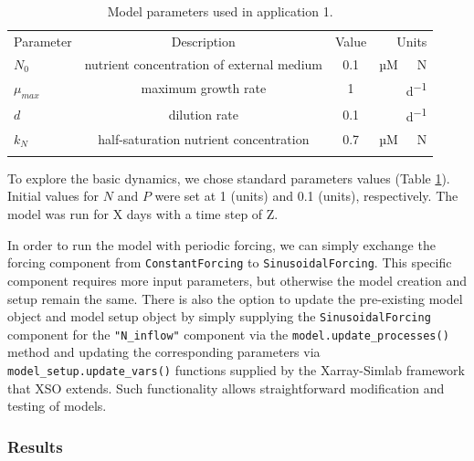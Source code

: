 \documentclass[journal abbreviation, manuscript]{copernicus}
\begin{document}
%
\begin{table}[t]
\caption{Model parameters used in application 1.}
\begin{tabular}{l c c r}
\tophline
Parameter & Description & Value & Units \\
\middlehline

$N_0$ & nutrient concentration of external medium & 0.1 & \unit{µM \ N} \\
$\mu_{max}$ & maximum growth rate & 1 & \unit{d^{-1}} \\
$d$ & dilution rate & 0.1 & \unit{d^{-1}}\\
$k_N$ & half-saturation nutrient concentration & 0.7 & \unit{µM \ N}\\

\bottomhline
\end{tabular}
\label{Table:UseCase1Parameters}
\end{table}
%

To explore the basic dynamics, we chose standard parameters values (Table \ref{Table:UseCase1Parameters}). Initial values for $N$ and $P$ were set at 1 (units) and 0.1 (units), respectively. The model was run for X days with a time step of Z.

In order to run the model with periodic forcing, we can simply exchange the forcing component from \texttt{ConstantForcing} to \texttt{SinusoidalForcing}. This specific component requires more input parameters, but otherwise the model creation and setup remain the same. There is also the option to update the pre-existing model object and model setup object by simply supplying the \texttt{SinusoidalForcing} component for the \texttt{"N\_inflow"} component via the \texttt{model.update\_processes()} method and updating the corresponding parameters via \texttt{model\_setup.update\_vars()} functions supplied by the Xarray-Simlab framework that XSO extends. Such functionality allows straightforward modification and testing of models.

\subsubsection{Results}
\end{document}
